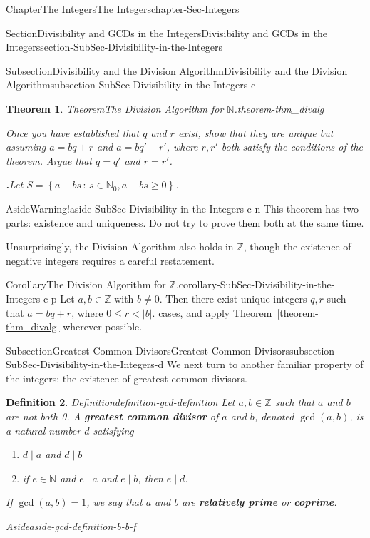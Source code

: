 \documentclass[oneside,10pt,]{book}
\newcommand{\blocktitlefont}{\relax}
\newcommand{\xreffont}{\relax}
\newcommand{\terminology}[1]{\textbf{#1}}
\numberwithin{equation}{section}
\renewcommand{\le}{\leqslant}
\renewcommand{\ge}{\geqslant}
\newcommand{\setof}[2]{{\left\{#1\,\colon\,#2\right\}}}
\def\Z{{\mathbb Z}}
\def\N{{\mathbb N}}
\newtheorem{theorem}{Theorem}[section]
\newtheorem{definition}[theorem]{Definition}
\newcommand{\lt}{<}
\begin{document}
\begin{chapterptx}{Chapter}{The Integers}{}{The Integers}{}{}{chapter-Sec-Integers}
\begin{sectionptx}{Section}{Divisibility and GCDs in the Integers}{}{Divisibility and GCDs in the Integers}{}{}{section-SubSec-Divisibility-in-the-Integers}
\begin{subsectionptx}{Subsection}{Divisibility and the Division Algorithm}{}{Divisibility and the Division Algorithm}{}{}{subsection-SubSec-Divisibility-in-the-Integers-c}
\begin{theorem}{Theorem}{The Division Algorithm for \(\N\).}{}{theorem-thm_divalg}
\par
Once you have established that \(q\) and \(r\) exist, show that they are unique but assuming \(a = bq+r\) and \(a = bq' + r'\), where \(r,r'\) both satisfy the conditions of the theorem. Argue that \(q = q'\) and \(r = r'\).%
\par\smallskip%
\noindent\textbf{\blocktitlefont 2.}\quad{}Let \(S = \setof{a-bs}{s\in \N_0, a-bs\ge 0}\).%
\end{theorem}
\begin{aside}{Aside}{Warning!}{aside-SubSec-Divisibility-in-the-Integers-c-n}%
This theorem has two parts: existence and uniqueness. Do not try to prove them both at the same time.%
\end{aside}
Unsurprisingly, the Division Algorithm also holds in \(\Z\), though the existence of negative integers requires a careful restatement. %
\begin{corollary}{Corollary}{The Division Algorithm for \(\Z\).}{}{corollary-SubSec-Divisibility-in-the-Integers-c-p}%
\index{Division Algorithm (\(\Z\))}%
Let \(a,b\in \Z\) with \(b\ne 0\). Then there exist unique integers \(q,r\) such that \(a = bq + r\), where \(0 \le r \lt |b|\).%
\noindentConsider cases, and apply \hyperref[theorem-thm_divalg]{Theorem~{\xreffont\ref{theorem-thm_divalg}}} wherever possible.%
\end{corollary}
\end{subsectionptx}
%
%
\typeout{************************************************}
\typeout{************************************************}
%
\begin{subsectionptx}{Subsection}{Greatest Common Divisors}{}{Greatest Common Divisors}{}{}{subsection-SubSec-Divisibility-in-the-Integers-d}
We next turn to another familiar property of the integers: the existence of greatest common divisors.%
\begin{definition}{Definition}{}{definition-gcd-definition}%
\index{greatest common divisor (\(\Z\))}%
Let \(a,b\in \Z\) such that \(a\) and \(b\) are not both 0. A \terminology{greatest common divisor} of \(a\) and \(b\), denoted \(\gcd(a,b)\), is a natural number \(d\) satisfying%
\begin{enumerate}
\item{}\(d\mid a\) and \(d\mid b\)%
\item{}if \(e\in \N\) and \(e\mid a\) and \(e\mid b\), then \(e\mid d\).%
\end{enumerate}
%
\par
If \(\gcd(a,b) = 1\), we say that \(a\) and \(b\) are \terminology{relatively prime} or \terminology{coprime}. \begin{aside}{Aside}{}{aside-gcd-definition-b-b-f}%

\end{aside}
\end{definition}
\end{subsectionptx}
\end{sectionptx}
\end{chapterptx}
\end{document}
